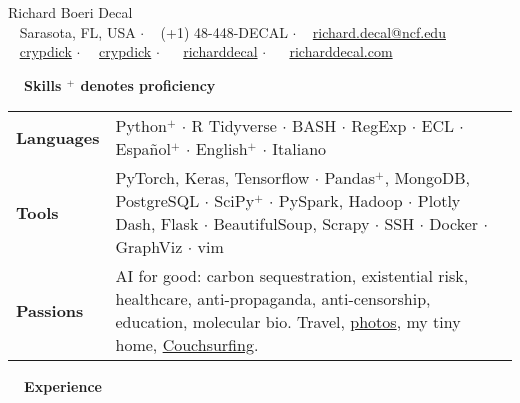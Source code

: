 \documentclass[a4paper,12pt]{article}
\newcommand{\resheading}[1]{{\vspace*{.001in} \colorbox{mygrey}{\begin{minipage}{\textwidth}{\textmd{\large \textbf{#1} \vphantom{p\^{E}}}}\end{minipage}}} }
\newcommand{\ressubheading}[4]{
        \textbf{#1} \hfill #2\\
        \textit{#3} \hfill #4 \\}
\begin{document}
\begin{center}
{\Huge Richard Boeri Decal} \\
{\small \faMapMarker~ Sarasota, FL, USA $\cdot$ \faPhone~ (+1) 48-448-DECAL $\cdot$ \faEnvelope~ \href{mailto:richard.decal@ncf.edu}{richard.decal@ncf.edu}  \\ \faGithubAlt~ \href{https://github.com/crypdick}{crypdick} $\cdot$~\faStackOverflow~  \href{https://stackoverflow.com/users/4212158/crypdick}{crypdick} $\cdot$ ~\faLinkedin~ \href{https://www.linkedin.com/in/richarddecal/}{richarddecal}  $\cdot$  ~\faHome~  \href{http://www.richarddecal.com}{richarddecal.com}}
\end{center}

\resheading{~~Skills \hfill {\small$^+$ denotes proficiency}}
\vspace{-1em}
\begin{tabularx}{\textwidth}{p{2.1cm}>{\arraybackslash}X}
  \bfseries{Languages} & Python$^+$ $\cdot$ R Tidyverse $\cdot$ BASH $\cdot$ RegExp $\cdot$ ECL $\cdot$ Espa\~nol$^+$ $\cdot$ English$^+$ $\cdot$ Italiano \\  %
  \bfseries{Tools} & PyTorch, Keras, Tensorflow  $\cdot$ Pandas$^+$, \mbox{MongoDB}, PostgreSQL $\cdot$ SciPy$^+$ $\cdot$ PySpark, Hadoop $\cdot$ Plotly Dash, Flask  $\cdot$ BeautifulSoup, Scrapy $\cdot$ SSH $\cdot$ Docker $\cdot$ GraphViz $\cdot$ vim \\%
  \bfseries{Passions} & AI for good: carbon sequestration, existential risk, healthcare, anti-propaganda, anti-censorship, education, molecular bio. Travel, \href{https://www.flickr.com/photos/richarddecal/sets/72157640025469005/}{photos}, my tiny home, \href{https://www.couchsurfing.com/people/rovingrichard/references}{Couchsurfing}.
\end{tabularx}


\resheading{~~Experience}
\vspace{-1em}
\end{document}
